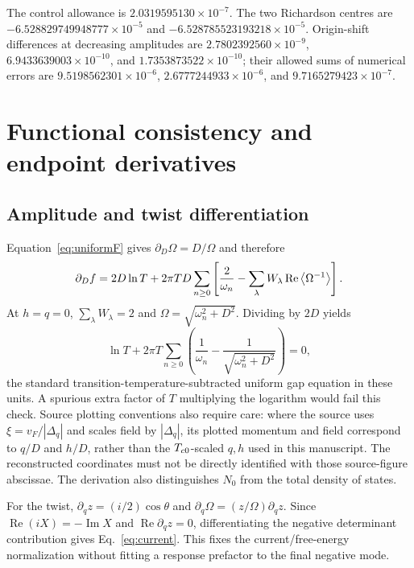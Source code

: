 \begin{flushleft}
The control allowance is $2.0319595130\times10^{-7}$. The two Richardson centres are $-6.528829749948777\times10^{-5}$ and $-6.528785523193218\times10^{-5}$. Origin-shift differences at decreasing amplitudes are $2.7802392560\times10^{-9}$, $6.9433639003\times10^{-10}$, and $1.7353873522\times10^{-10}$; their allowed sums of numerical errors are $9.5198562301\times10^{-6}$, $2.6777244933\times10^{-6}$, and $9.7165279423\times10^{-7}$.
\end{flushleft}

\section{Functional consistency and endpoint derivatives}\label{app:functional}
\subsection{Amplitude and twist differentiation}
Equation~\eqref{eq:uniformF} gives $\partial_D\Omega=D/\Omega$ and therefore
\begin{equation}
 \partial_Df=2D\ln T+2\pi TD\sum_{n\ge0}
 \left[\frac{2}{\omega_n}-\sum_\lambda W_\lambda
 \operatorname{Re}\left\langle \Omega^{-1}\right\rangle\right].
\end{equation}
At $h=q=0$, $\sum_\lambda W_\lambda=2$ and $\Omega=\sqrt{\omega_n^2+D^2}$. Dividing by $2D$ yields
\begin{equation}
 \ln T+2\pi T\sum_{n\ge0}
 \left(\frac{1}{\omega_n}-\frac{1}{\sqrt{\omega_n^2+D^2}}\right)=0,
\end{equation}
the standard transition-temperature-subtracted uniform gap equation in these units. A spurious extra factor of $T$ multiplying the logarithm would fail this check. Source plotting conventions also require care: where the source uses $\xi=v_F/|\Delta_q|$ and scales field by $|\Delta_q|$, its plotted momentum and field correspond to $q/D$ and $h/D$, rather than the $T_{c0}$-scaled $q,h$ used in this manuscript. The reconstructed coordinates must not be directly identified with those source-figure abscissae. The derivation also distinguishes $N_0$ from the total density of states.

For the twist, $\partial_qz=(i/2)\cos\theta$ and $\partial_q\Omega=(z/\Omega)\partial_qz$. Since $\operatorname{Re}(iX)=-\operatorname{Im}X$ and $\operatorname{Re}\partial_qz=0$, differentiating the negative determinant contribution gives Eq.~\eqref{eq:current}. This fixes the current/free-energy normalization without fitting a response prefactor to the final negative mode.

